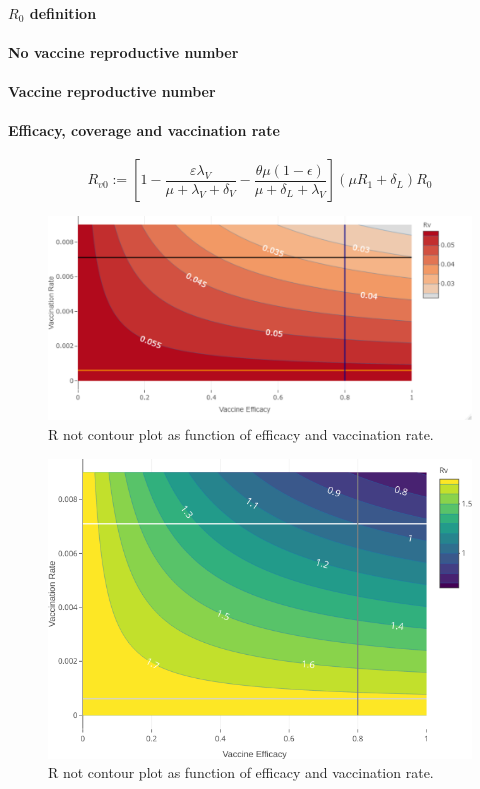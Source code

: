 \paragraph{$R_0$ definition}
\paragraph{No  vaccine reproductive number}
\paragraph{Vaccine reproductive number}
\paragraph{Efficacy, coverage and vaccination rate}



\begin{equation*}
 R_{v0} := \left[ 1-\frac{\varepsilon \lambda_V}
 {\mu+\lambda_V+\delta_V}
 -\frac{\theta\mu(1-\epsilon)}{\mu+\delta_L+\lambda_V}\right]
 (\mu R_1+\delta_L)R_0
\end{equation*}
\begin{figure}[tbh]
    \centering
    \includegraphics[scale=0.565, keepaspectratio]{Figures/Rv_contour}
    \caption{R not contour plot as function of efficacy and vaccination rate.}
    \label{fig:rvcontour1}
\end{figure}

\begin{figure}[tbh]
    \centering
    \includegraphics[scale=2.1, keepaspectratio]{Figures/R0_contour_1}
    \caption{R not contour plot as function of efficacy and vaccination rate.}
    \label{fig:r0contour1}
\end{figure}



